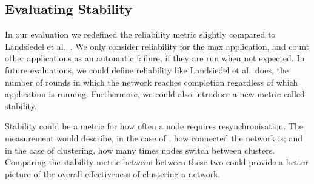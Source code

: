 \subsection{Evaluating Stability}
In our evaluation we redefined the reliability metric slightly compared to Landsiedel et al.~\cite{chaos-introduction-paper}. We only consider reliability for the max application, and count other applications as an automatic failure, if they are run when not expected. In future evaluations, we could define reliability like Landsiedel et al.~does, the number of rounds in which the network reaches completion regardless of which application is running. Furthermore, we could also introduce a new metric called stability.

Stability could be a metric for how often a node requires resynchronisation. The measurement would describe, in the case of \atwo{}, how connected the network is; and in the case of clustering, how many times nodes switch between clusters. Comparing the stability metric between between these two could provide a better picture of the overall effectiveness of clustering a network.